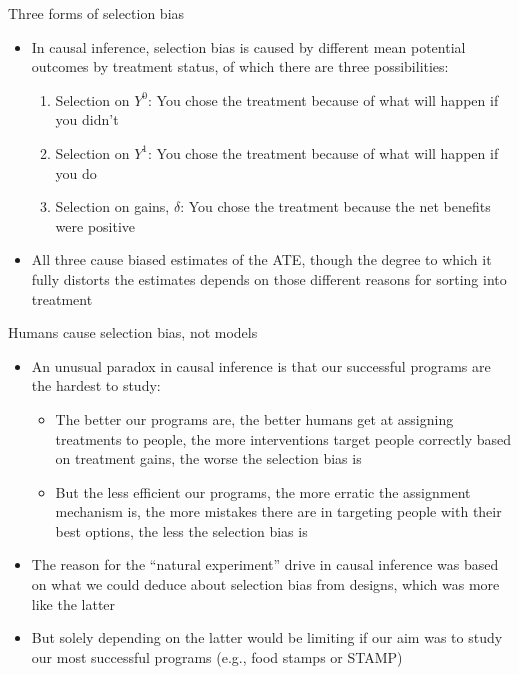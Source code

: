 \documentclass{beamer}
\begin{document}
\begin{frame}{Three forms of selection bias}

  \begin{itemize}
    \item In causal inference, selection bias is caused by different mean potential outcomes by treatment status, of which there are three possibilities:
		\begin{enumerate}
   \item Selection on $Y^0$: You chose the treatment because of what will happen if you didn't
    \item Selection on $Y^1$: You chose the treatment because of what will happen if you do
    \item Selection on gains, $\delta$: You chose the treatment because the net benefits were positive
    	\end{enumerate}
	\item All three cause biased estimates of the ATE, though the degree to which it fully distorts the estimates depends on those different reasons for sorting into treatment
      \end{itemize}

\end{frame}



\begin{frame}{Humans cause selection bias, not models}

\begin{itemize}
\item An unusual paradox in causal inference is that our successful programs are the hardest to study:
	\begin{itemize}
	\item The better our programs are, the better humans get at assigning treatments to people, the more interventions target people correctly based on treatment gains, the worse the selection bias is
	\item But the less efficient our programs, the more erratic the assignment mechanism is, the more mistakes there are in targeting people with their best options, the less the selection bias is
	\end{itemize}
\item The reason for the ``natural experiment'' drive in causal inference was based on what we could deduce about selection bias from designs, which was more like the latter
\item But solely depending on the latter would be limiting if our aim was to study our most successful programs (e.g., food stamps or STAMP)
\end{itemize}

\end{frame}
\end{document}
